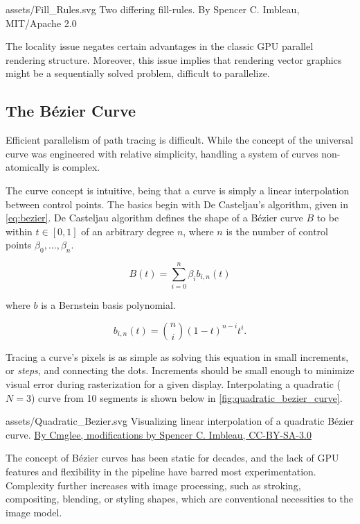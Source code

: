 \svg
{assets/Fill_Rules.svg}
{\label{fig:fill_rule}Two differing fill-rules.}
{By Spencer C. Imbleau, MIT/Apache 2.0}

The locality issue negates certain advantages in the classic GPU parallel rendering structure. Moreover,  this issue implies that rendering vector graphics might be a sequentially solved problem, difficult to parallelize.

\subsection{The Bézier Curve}
Efficient parallelism of path tracing is difficult. While the concept of the universal curve was engineered with relative simplicity, handling a system of curves non-atomically is complex.\medskip

The curve concept is intuitive, being that a curve is simply a linear interpolation between control points. The basics begin with De Casteljau's algorithm\cite{Pomax22}, given in \cref{eq:bezier}. De Casteljau algorithm defines the shape of a Bézier curve \(B\) to be within \(t \in [0,1]\) of an arbitrary degree \(n\), where \(n\) is the number of control points \(\beta_0, \ldots, \beta_n\).\medskip

\begin{equation}\label{eq:bezier}
B(t) = \sum_{i=0}^{n}\beta_{i}b_{i,n}(t)
\end{equation}
\begin{center}
where \(b\) is a Bernstein basis polynomial.
\end{center}
\[
b_{i,n}(t) = \binom{n}{i}(1-t)^{n-i}t^i.
\]\medskip

Tracing a curve's pixels is as simple as solving this equation in small increments, or \textit{steps}, and connecting the dots. Increments should be small enough to minimize visual error during rasterization for a given display. Interpolating a quadratic (\(N=3\)) curve from 10 segments is shown below in \cref{fig:quadratic_bezier_curve}.\medskip

\svg
{assets/Quadratic_Bezier.svg}
{\label{fig:quadratic_bezier_curve}Visualizing linear interpolation of a quadratic Bézier curve.}
{\href{https://commons.wikimedia.org/wiki/File:Quadratic_Beziers_in_string_art.svg}{By Cmglee, modifications by Spencer C. Imbleau, CC-BY-SA-3.0}}\medskip

The concept of Bézier curves has been static for decades, and the lack of GPU features and flexibility in the pipeline have barred most experimentation. Complexity further increases with image processing, such as stroking, compositing, blending, or styling shapes, which are conventional necessities to the image model.


